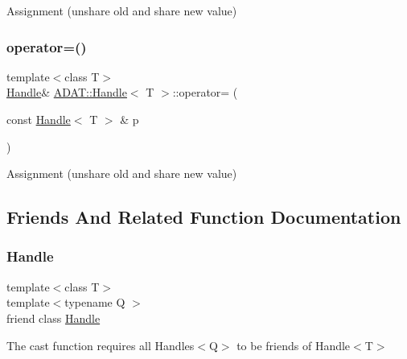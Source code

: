 Assignment (unshare old and share new value) 

\mbox{\label{classADAT_1_1Handle_a2d5773885c448de401319f9523742954}} 
\subsubsection{\texorpdfstring{operator=()}{operator=()}\hspace{0.1cm}{\footnotesize\ttfamily [3/3]}}
{\footnotesize\ttfamily template$<$class T$>$ \\
\mbox{\hyperlink{classADAT_1_1Handle}{Handle}}\& \mbox{\hyperlink{classADAT_1_1Handle}{A\+D\+A\+T\+::\+Handle}}$<$ T $>$\+::operator= (\begin{DoxyParamCaption}\item[{const \mbox{\hyperlink{classADAT_1_1Handle}{Handle}}$<$ T $>$ \&}]{p }\end{DoxyParamCaption})\hspace{0.3cm}{\ttfamily [inline]}}



Assignment (unshare old and share new value) 



\subsection{Friends And Related Function Documentation}
\mbox{\label{classADAT_1_1Handle_a67ca1a2d91273eaf85fb3d23ba8ce984}} 
\subsubsection{\texorpdfstring{Handle}{Handle}\hspace{0.1cm}{\footnotesize\ttfamily [1/3]}}
{\footnotesize\ttfamily template$<$class T$>$ \\
template$<$typename Q $>$ \\
friend class \mbox{\hyperlink{classADAT_1_1Handle}{Handle}}\hspace{0.3cm}{\ttfamily [friend]}}



The cast function requires all Handles$<$\+Q$>$ to be friends of Handle$<$\+T$>$ 

